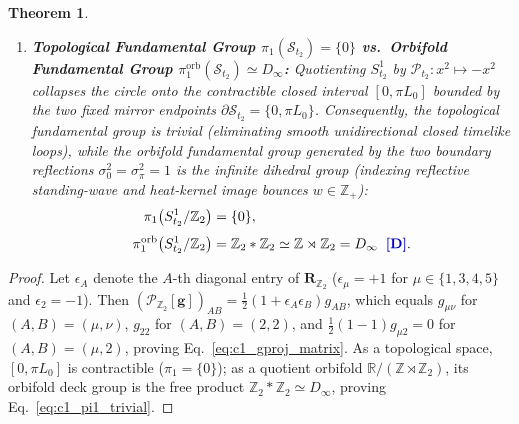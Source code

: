 \documentclass[11pt,a4paper]{article}
\newcommand{\catD}{\text{\textbf{\textcolor{blue!75!black}{[D]}}}}
\theoremstyle{definition}
\theoremstyle{plain}
\newtheorem{theorem}[axiom]{Theorem}
\theoremstyle{remark}
\begin{document}
\begin{theorem}
\begin{enumerate}[label=(\roman*)]
\begin{align}
\begin{pmatrix}
  g_{14} & \mathbf{0} & g_{34} & g_{44} & g_{45} \\
  g_{15} & \mathbf{0} & g_{35} & g_{45} & g_{55}
  \end{pmatrix}, \nonumber \\[4pt]
  g_{\mu 2} &= g_{2\mu} \equiv 0 \qquad \forall\,\mu \in \{1,3,4,5\} \;\;\catD, \label{eq:c1_gproj_matrix}
  \end{align}
  preserving the 10 macroscopic metric components $g_{\mu\nu}$ and the 1 diagonal secondary-time breathing scalar $g_{22} = -\Phi^2$ ($15 - 4 = 11$ even components).
  \item \textbf{Topological Fundamental Group $\pi_1(\mathcal{S}_{t_2}) = \{0\}$ vs.\ Orbifold Fundamental Group $\pi_1^{\mathrm{orb}}(\mathcal{S}_{t_2}) \simeq D_\infty$:}
  Quotienting $S^1_{t_2}$ by $\mathcal{P}_{t_2}: x^2 \mapsto -x^2$ collapses the circle onto the contractible closed interval $[0, \pi L_0]$ bounded by the two fixed mirror endpoints $\partial\mathcal{S}_{t_2} = \{0, \pi L_0\}$. Consequently, the topological fundamental group is trivial (eliminating smooth unidirectional closed timelike loops), while the orbifold fundamental group generated by the two boundary reflections $\sigma_0^2 = \sigma_\pi^2 = 1$ is the infinite dihedral group (indexing reflective standing-wave and heat-kernel image bounces $w \in \mathbb{Z}_+$):
  \begin{align}
  \pi_1\!\left(S^1_{t_2}/\mathbb{Z}_2\right) &= \{0\}, \nonumber \\[3pt]
  \pi_1^{\mathrm{orb}}\!\left(S^1_{t_2}/\mathbb{Z}_2\right) &= \mathbb{Z}_2 * \mathbb{Z}_2 \simeq \mathbb{Z} \rtimes \mathbb{Z}_2 = D_\infty \;\;\catD. \label{eq:c1_pi1_trivial}
  \end{align}
\end{enumerate}
\end{theorem}

\begin{proof}
Let $\epsilon_A$ denote the $A$-th diagonal entry of $\mathbf{R}_{\mathbb{Z}_2}$ ($\epsilon_\mu = +1$ for $\mu \in \{1,3,4,5\}$ and $\epsilon_2 = -1$). Then $(\mathcal{P}_{\mathbb{Z}_2}[\mathbf{g}])_{AB} = \frac{1}{2}(1 + \epsilon_A\epsilon_B)g_{AB}$, which equals $g_{\mu\nu}$ for $(A,B)=(\mu,\nu)$, $g_{22}$ for $(A,B)=(2,2)$, and $\frac{1}{2}(1-1)g_{\mu 2} = 0$ for $(A,B)=(\mu,2)$, proving Eq.~\eqref{eq:c1_gproj_matrix}. As a topological space, $[0, \pi L_0]$ is contractible ($\pi_1 = \{0\}$); as a quotient orbifold $\mathbb{R}/(\mathbb{Z} \rtimes \mathbb{Z}_2)$, its orbifold deck group is the free product $\mathbb{Z}_2 * \mathbb{Z}_2 \simeq D_\infty$, proving Eq.~\eqref{eq:c1_pi1_trivial}.
\end{proof}
\end{document}
